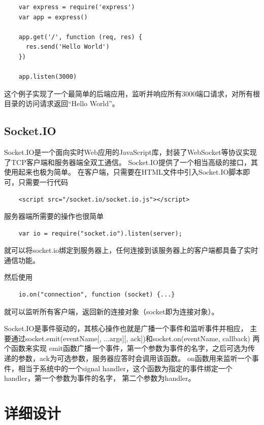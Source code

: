 \documentclass[11pt]{ctexart}
\begin{document}
\begin{verbatim}
    var express = require('express')
    var app = express()
    
    app.get('/', function (req, res) {
      res.send('Hello World')
    })
    
    app.listen(3000)
\end{verbatim}

这个例子实现了一个最简单的后端应用，监听并响应所有3000端口请求，对所有根目录的访问请求返回“Hello World”。

\subsection{Socket.IO}
Socket.IO是一个面向实时Web应用的JavaScript库，封装了WebSocket等协议实现了TCP客户端和服务器端全双工通信。
Socket.IO提供了一个相当高级的接口，其使用起来也极为简单。
在客户端，只需要在HTML文件中引入Socket.IO脚本即可，只需要一行代码
\begin{verbatim}
    <script src="/socket.io/socket.io.js"></script>
\end{verbatim}

服务器端所需要的操作也很简单
\begin{verbatim}
    var io = require("socket.io").listen(server);
\end{verbatim}
就可以将socket.io绑定到服务器上，任何连接到该服务器上的客户端都具备了实时通信功能。

然后使用
\begin{verbatim}
    io.on("connection", function (socket) {...}
\end{verbatim}
就可以监听所有客户端，返回新的连接对象（socket即为连接对象）。

Socket.IO是事件驱动的，其核心操作也就是广播一个事件和监听事件并相应，
主要通过\textsf{socket.emit(eventName[, ...args][, ack])}和\textsf{socket.on(eventName, callback)}
两个函数来实现
\textsf{emit}函数广播一个事件，第一个参数为事件的名字，之后可选为传递的参数，\textsf{ack}为可选参数，服务器应答时会调用该函数。
\textsf{on}函数用来监听一个事件，相当于系统中的一个signal handler，这个函数为指定的事件绑定一个handler，第一个参数为事件的名字，
第二个参数为handler。

\section{详细设计}
\end{document}
